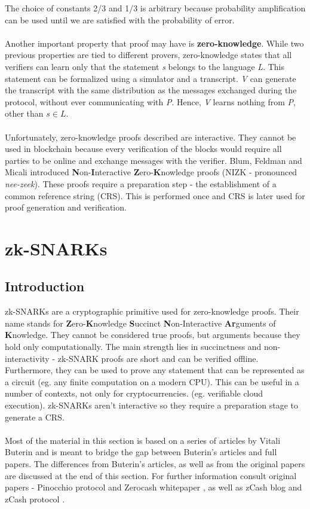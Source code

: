 The choice of constants 2/3 and 1/3 is arbitrary because probability amplification can be used until we are satisfied with the probability of error.\\
\\
Another important property that proof may have is \textbf{zero-knowledge}. While two previous properties are tied to different provers, zero-knowledge states that all verifiers can learn only that the statement \textit{s} belongs to the language \textit{L}. This statement can be formalized using a simulator and a transcript. \textit{V} can generate the transcript with the same distribution as the messages exchanged during the protocol, without ever communicating with \textit{P}. Hence, \textit{V} learns nothing from \textit{P}, other than $s \in L$.\\
\\
Unfortunately, zero-knowledge proofs described are interactive. They cannot be used in blockchain because every verification of the blocks would require all parties to be online and exchange messages with the verifier. Blum, Feldman and Micali \cite{blum1988non} introduced \textbf{N}on-\textbf{I}nteractive \textbf{Z}ero-\textbf{K}nowledge proofs (NIZK - pronounced \textit{nee-zeek}). These proofs require a preparation step - the establishment of a common reference string (CRS). This is performed once and CRS is later used for proof generation and verification.

\section{zk-SNARKs}

\subsection{Introduction}
zk-SNARKs are a cryptographic primitive used for zero-knowledge proofs. Their name stands for \textbf{Z}ero-\textbf{K}nowledge \textbf{S}uccinct \textbf{N}on-Interactive \textbf{Ar}guments of \textbf{K}nowledge. They cannot be considered true proofs, but arguments because they hold only computationally. The main strength lies in succinctness and non-interactivity - zk-SNARK proofs are short and can be verified offline. Furthermore, they can be used to prove any statement that can be represented as a circuit (eg. any finite computation on a modern CPU). This can be useful in a number of contexts, not only for cryptocurrencies. (eg. verifiable cloud execution). zk-SNARKs aren't interactive so they require a preparation stage to generate a CRS.\\
\\
Most of the material in this section is based on a series of articles by Vitali Buterin\cite{buterin1, buterin2, buterin3} and is meant to bridge the gap between Buterin's articles and full papers. The differences from Buterin's articles, as well as from the original papers are discussed at the end of this section. For further information consult original papers - Pinocchio protocol\cite{parno2013pinocchio} and Zerocash whitepaper \cite{sasson2014zerocash}, as well as zCash blog \cite{zcashzksnarks} and zCash protocol \cite{zcashprotocol}. %


